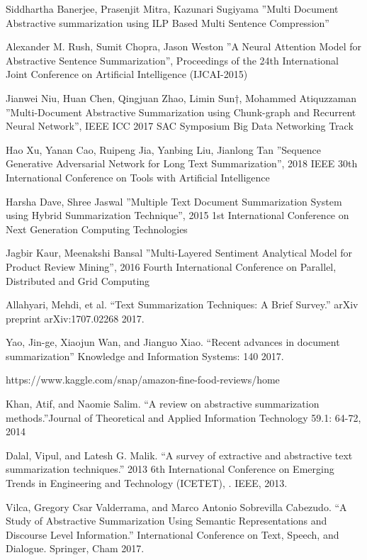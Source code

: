 \documentclass[11pt]{report}
\begin{document}
\begin{thebibliography}{999}
Siddhartha Banerjee, Prasenjit Mitra, Kazunari Sugiyama ”Multi Document Abstractive summarization using ILP Based Multi Sentence Compression”

 Alexander M. Rush, Sumit Chopra, Jason Weston ”A Neural Attention Model for Abstractive Sentence Summarization”, Proceedings of the 24th International Joint Conference on Artificial Intelligence (IJCAI-2015)

Jianwei Niu, Huan Chen, Qingjuan Zhao, Limin Sun†, Mohammed Atiquzzaman ”Multi-Document Abstractive Summarization using Chunk-graph and Recurrent Neural Network”, IEEE ICC 2017 SAC Symposium Big Data Networking Track

Hao Xu, Yanan Cao, Ruipeng Jia, Yanbing Liu, Jianlong Tan ”Sequence Generative Adversarial Network for Long Text Summarization”, 2018 IEEE 30th International Conference on Tools with Artificial Intelligence

Harsha Dave, Shree Jaswal ”Multiple Text Document Summarization System using Hybrid Summarization Technique”, 2015 1st International Conference on Next Generation Computing Technologies

Jagbir Kaur, Meenakshi Bansal ”Multi-Layered Sentiment Analytical Model for Product Review Mining”, 2016 Fourth International Conference on Parallel, Distributed and Grid Computing

Allahyari, Mehdi, et al. “Text Summarization Techniques: A Brief Survey.” arXiv preprint arXiv:1707.02268 2017.

Yao, Jin-ge, Xiaojun Wan, and Jianguo Xiao. “Recent advances in document summarization” Knowledge and Information Systems: 140 2017.

https://www.kaggle.com/snap/amazon-fine-food-reviews/home

Khan, Atif, and Naomie Salim. “A review on abstractive summarization methods.”Journal of Theoretical and Applied Information Technology 59.1: 64-72, 2014

Dalal, Vipul, and Latesh G. Malik. “A survey of extractive and abstractive text summarization techniques.” 2013 6th International Conference on Emerging Trends in Engineering and Technology (ICETET), . IEEE, 2013.

Vilca, Gregory Csar Valderrama, and Marco Antonio Sobrevilla Cabezudo. “A Study of Abstractive Summarization Using Semantic Representations and Discourse Level Information.” International Conference on Text, Speech, and Dialogue. Springer, Cham 2017.


\end{thebibliography}
\end{document}
